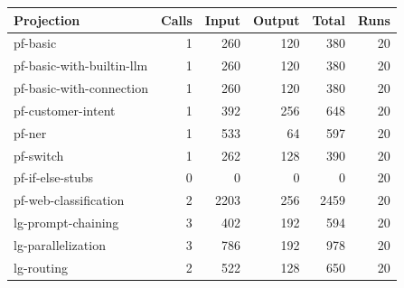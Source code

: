 \begin{tabular}{lrrrrr}
\hline
Projection & Calls & Input & Output & Total & Runs \\
\hline
pf-basic & 1 & 260 & 120 & 380 & 20 \\
pf-basic-with-builtin-llm & 1 & 260 & 120 & 380 & 20 \\
pf-basic-with-connection & 1 & 260 & 120 & 380 & 20 \\
pf-customer-intent & 1 & 392 & 256 & 648 & 20 \\
pf-ner & 1 & 533 & 64 & 597 & 20 \\
pf-switch & 1 & 262 & 128 & 390 & 20 \\
pf-if-else-stubs & 0 & 0 & 0 & 0 & 20 \\
pf-web-classification & 2 & 2203 & 256 & 2459 & 20 \\
lg-prompt-chaining & 3 & 402 & 192 & 594 & 20 \\
lg-parallelization & 3 & 786 & 192 & 978 & 20 \\
lg-routing & 2 & 522 & 128 & 650 & 20 \\
\hline
\end{tabular}
